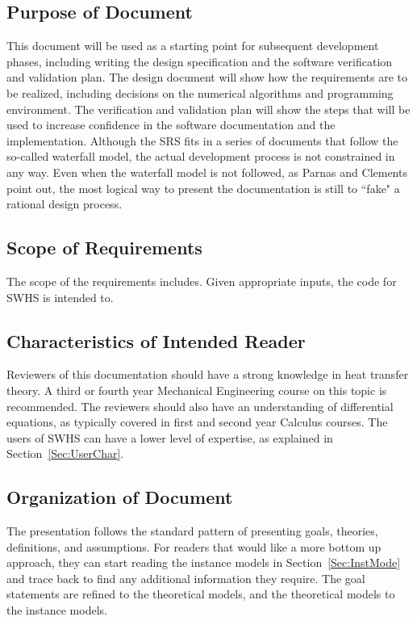 \documentclass[12pt]{article}
\begin{document}
\subsection{Purpose of Document}
\label{Sec:PurpofDocu}
This document will be used as a starting point for subsequent development phases, including writing the design specification and the software verification and validation plan. The design document will show how the requirements are to be realized, including decisions on the numerical algorithms and programming environment. The verification and validation plan will show the steps that will be used to increase confidence in the software documentation and the implementation. Although the SRS fits in a series of documents that follow the so-called waterfall model, the actual development process is not constrained in any way. Even when the waterfall model is not followed, as Parnas and Clements point out, the most logical way to present the documentation is still to ``fake" a rational design process.
\subsection{Scope of Requirements}
\label{Sec:ScopofRequ}
The scope of the requirements includes. Given appropriate inputs, the code for SWHS is intended to.
\subsection{Characteristics of Intended Reader}
\label{Sec:CharofInteRead}
Reviewers of this documentation should have a strong knowledge in heat transfer theory. A third or fourth year Mechanical Engineering course on this topic is recommended. The reviewers should also have an understanding of differential equations, as typically covered in first and second year Calculus courses. The users of SWHS can have a lower level of expertise, as explained in Section~\ref{Sec:UserChar}.
\subsection{Organization of Document}
\label{Sec:OrgaofDocu}
The presentation follows the standard pattern of presenting goals, theories, definitions, and assumptions. For readers that would like a more bottom up approach, they can start reading the instance models in Section~\ref{Sec:InstMode} and trace back to find any additional information they require.
The goal statements are refined to the theoretical models, and the theoretical models to the instance models.
\end{document}
